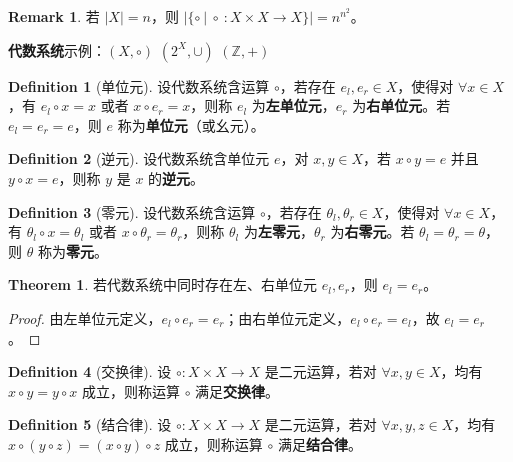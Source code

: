 \documentclass[oneside]{book}
\theoremstyle{definition}
\newtheorem{definition}{Definition}[section]
\newtheorem{theorem}{Theorem}[section]
\newtheorem{remark}{Remark}[section]
\begin{document}
	\begin{remark}
		若 \( |X| = n \)，则 \(|\{ \circ\ |\ \circ\ :X \times X \to X\} |= n^{n^2} \)。
	\end{remark}
	
	\textbf{代数系统}示例：\( (X, \circ) \) \( (2^X, \cup) \) \( (\mathbb{Z}, +) \)
	\begin{definition}[单位元]
		设代数系统含运算 \( \circ \)，若存在 \( e_l, e_r \in X \)，使得对 \( \forall x \in X \)，有 \( e_l \circ x = x \) 或者 \( x \circ e_r = x \)，则称 \( e_l \) 为\textbf{左单位元}，\( e_r \) 为\textbf{右单位元}。若 \( e_l = e_r = e \)，则 \( e \) 称为\textbf{单位元}（或幺元）。
	\end{definition}
	
	\begin{definition}[逆元]
		设代数系统含单位元 \( e \)，对 \( x, y \in X \)，若 \( x \circ y = e \) 并且  \( y \circ x = e \)，则称 \( y \) 是 \( x \) 的\textbf{逆元}。
	\end{definition}
	
	\begin{definition}[零元]
		设代数系统含运算 \( \circ \)，若存在 \( \theta_l, \theta_r \in X \)，使得对 \( \forall x \in X \)，有 \( \theta_l \circ x = \theta_l \) 或者 \( x \circ \theta_r = \theta_r \)，则称 \( \theta_l \) 为\textbf{左零元}，\( \theta_r \) 为\textbf{右零元}。若 \( \theta_l = \theta_r = \theta \)，则 \( \theta \) 称为\textbf{零元}。
	\end{definition}
	
	\begin{theorem}
		若代数系统中同时存在左、右单位元 \( e_l, e_r \)，则 \( e_l = e_r \)。
	\end{theorem}
	
\begin{proof}
	由左单位元定义，\( e_l \circ e_r = e_r \)；由右单位元定义，\( e_l \circ e_r = e_l \)，故 \( e_l = e_r \)。
\end{proof}
	
	
	\begin{definition}[交换律]
		设 \( \circ: X \times X \to X \) 是二元运算，若对 \( \forall x, y \in X \)，均有 \( x \circ y = y \circ x \) 成立，则称运算 \( \circ \) 满足\textbf{交换律}。
	\end{definition}
	
	\begin{definition}[结合律]
		设 \( \circ: X \times X \to X \) 是二元运算，若对 \( \forall x, y, z \in X \)，均有 \( x \circ (y \circ z) = (x \circ y) \circ z \) 成立，则称运算 \( \circ \) 满足\textbf{结合律}。
	\end{definition}
	
\end{document}
